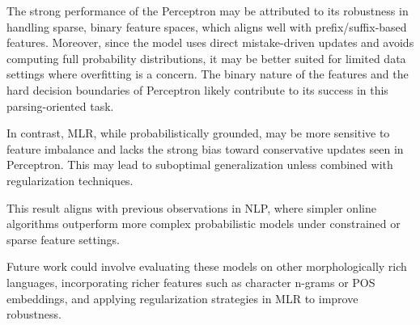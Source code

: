 \documentclass[11pt]{article}
\begin{document}
The strong performance of the Perceptron may be attributed to its robustness in handling sparse, binary feature spaces, which aligns well with prefix/suffix-based features. Moreover, since the model uses direct mistake-driven updates and avoids computing full probability distributions, it may be better suited for limited data settings where overfitting is a concern. The binary nature of the features and the hard decision boundaries of Perceptron likely contribute to its success in this parsing-oriented task.

In contrast, MLR, while probabilistically grounded, may be more sensitive to feature imbalance and lacks the strong bias toward conservative updates seen in Perceptron. This may lead to suboptimal generalization unless combined with regularization techniques.

This result aligns with previous observations in NLP, where simpler online algorithms outperform more complex probabilistic models under constrained or sparse feature settings.

Future work could involve evaluating these models on other morphologically rich languages, incorporating richer features such as character n-grams or POS embeddings, and applying regularization strategies in MLR to improve robustness.


\clearpage

\nocite{*}


\end{document}
